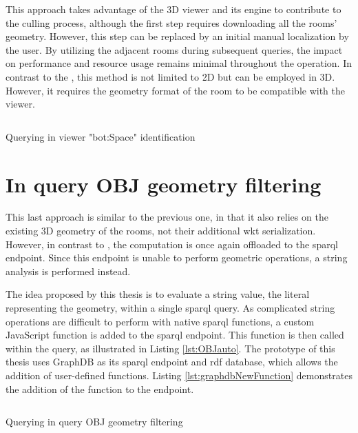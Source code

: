 This approach takes advantage of the 3D viewer and its engine to contribute to the culling process, although the first step requires downloading all the rooms' geometry. However, this step can be replaced by an initial manual localization by the user. By utilizing the adjacent rooms during subsequent queries, the impact on performance and resource usage remains minimal throughout the operation. In contrast to the , this method is not limited to 2D but can be employed in 3D. However, it requires the geometry format of the room to be compatible with the viewer.

\begin{listing}[H]
    \inputminted{sparql}{dynamicQueries/inViewer/query.rq}
    \vspace{-0.7cm}
    \caption{Querying in viewer "bot:Space" identification}
    \label{lst:BOTauto}
\end{listing}

\section{In query OBJ geometry filtering} \label{sec:inQuery}
This last approach is similar to the previous one, in that it also relies on the existing 3D geometry of the rooms, not their additional \ac{wkt} serialization. However, in contrast to , the computation is once again offloaded to the \ac{sparql} endpoint. Since this endpoint is unable to perform geometric operations, a string analysis is performed instead.

The idea proposed by this thesis is to evaluate a string value, the literal representing the geometry, within a single \ac{sparql} query. As complicated string operations are difficult to perform with native \ac{sparql} functions, a custom JavaScript function is added to the \ac{sparql} endpoint. This function is then called within the query, as illustrated in Listing \ref{lst:OBJauto}. The prototype of this thesis uses GraphDB as its \ac{sparql} endpoint and \ac{rdf} database, which allows the addition of user-defined functions. Listing \ref{lst:graphdbNewFunction} demonstrates the addition of the function to the endpoint.

\begin{listing}[H]
    \inputminted{sparql}{dynamicQueries/inQuery/query.rq}
    \vspace{-0.7cm}
    \caption{Querying in query OBJ geometry filtering}
    \label{lst:OBJauto}
\end{listing}

